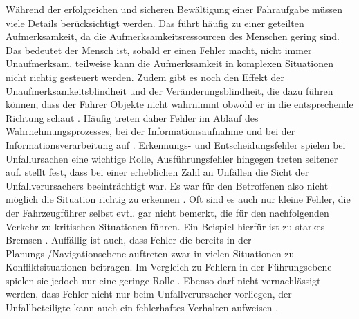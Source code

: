 Während der erfolgreichen und sicheren Bewältigung einer Fahraufgabe müssen viele Details berücksichtigt werden. Das führt häufig zu einer geteilten Aufmerksamkeit, da die Aufmerksamkeitsressourcen des Menschen gering sind. Das bedeutet der Mensch ist, sobald er einen Fehler macht, nicht immer Unaufmerksam, teilweise kann die Aufmerksamkeit in komplexen Situationen nicht richtig gesteuert werden. Zudem gibt es noch den Effekt der Unaufmerksamkeitsblindheit und der Veränderungsblindheit, die dazu führen können, dass der Fahrer Objekte nicht wahrnimmt obwohl er in die entsprechende Richtung schaut \parencite[S. 31-33]{Gerstenberger.17.02.2015}. Häufig treten daher Fehler im Ablauf des Wahrnehmungsprozesses, bei der Informationsaufnahme und bei der Informationsverarbeitung auf \parencite[S. 47]{DEKRA.2017}. Erkennungs- und Entscheidungsfehler spielen bei Unfallursachen eine wichtige Rolle, Ausführungsfehler hingegen treten seltener auf. \Textcite [S. 152]{Grundl.2005} stellt fest, dass bei einer erheblichen Zahl an Unfällen die Sicht der Unfallverursachers beeinträchtigt war. Es war für den Betroffenen also nicht möglich die Situation richtig zu erkennen \parencite[S. 152]{Grundl.2005}. Oft sind es auch nur kleine Fehler, die der Fahrzeugführer selbst evtl. gar nicht bemerkt, die für den nachfolgenden Verkehr zu kritischen Situationen führen. Ein Beispiel hierfür ist zu starkes Bremsen \parencite[S. 1]{Hoffmann.26.04.2013}. Auffällig ist auch, dass Fehler die bereits in der Planungs-/Navigationsebene auftreten zwar in vielen Situationen zu Konfliktsituationen beitragen. Im Vergleich zu Fehlern in der Führungsebene spielen sie jedoch nur eine geringe Rolle \parencite[S. 39f]{Reichart.2001}. Ebenso darf nicht vernachlässigt werden, dass Fehler nicht nur beim Unfallverursacher vorliegen, der Unfallbeteiligte kann auch ein fehlerhaftes Verhalten aufweisen \parencite[S. 107]{Grundl.2005}.

